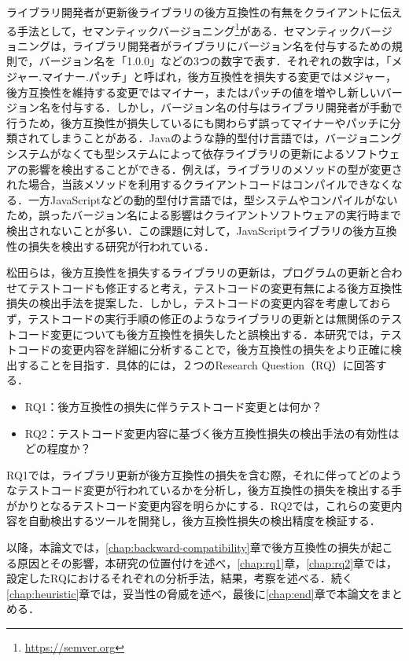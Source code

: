\documentclass[11pt,dvipdfmx]{jreport}
\begin{document}
ライブラリ開発者が更新後ライブラリの後方互換性の有無をクライアントに伝える手法として，セマンティックバージョニング\footnote{\url{https://semver.org}}がある．セマンティックバージョニングは，ライブラリ開発者がライブラリにバージョン名を付与するための規則で，バージョン名を「1.0.0」などの3つの数字で表す．それぞれの数字は，「メジャー.マイナー.パッチ」と呼ばれ，後方互換性を損失する変更ではメジャー，後方互換性を維持する変更ではマイナー，またはパッチの値を増やし新しいバージョン名を付与する．しかし，バージョン名の付与はライブラリ開発者が手動で行うため，後方互換性が損失しているにも関わらず誤ってマイナーやパッチに分類されてしまうことがある．Javaのような静的型付け言語では，バージョニングシステムがなくても型システムによって依存ライブラリの更新によるソフトウェアの影響を検出することができる．例えば，ライブラリのメソッドの型が変更された場合，当該メソッドを利用するクライアントコードはコンパイルできなくなる．一方JavaScriptなどの動的型付け言語では，型システムやコンパイルがないため，誤ったバージョン名による影響はクライアントソフトウェアの実行時まで検出されないことが多い．この課題に対して，JavaScriptライブラリの後方互換性の損失を検出する研究が行われている．

松田らは，後方互換性を損失するライブラリの更新は，プログラムの更新と合わせてテストコードも修正すると考え，テストコードの変更有無による後方互換性損失の検出手法を提案した\cite{matsuda}．しかし，テストコードの変更内容を考慮しておらず，テストコードの実行手順の修正のようなライブラリの更新とは無関係のテストコード変更についても後方互換性を損失したと誤検出する．本研究では，テストコードの変更内容を詳細に分析することで，後方互換性の損失をより正確に検出することを目指す．具体的には，２つのResearch Question（RQ）に回答する．

\begin{itemize}
  \item RQ1：後方互換性の損失に伴うテストコード変更とは何か？
  \item RQ2：テストコード変更内容に基づく後方互換性損失の検出手法の有効性はどの程度か？
\end{itemize}

RQ1では，ライブラリ更新が後方互換性の損失を含む際，それに伴ってどのようなテストコード変更が行われているかを分析し，後方互換性の損失を検出する手がかりとなるテストコード変更内容を明らかにする．RQ2では，これらの変更内容を自動検出するツールを開発し，後方互換性損失の検出精度を検証する．

以降，本論文では，\ref{chap:backward-compatibility}章で後方互換性の損失が起こる原因とその影響，本研究の位置付けを述べ，\ref{chap:rq1}章，\ref{chap:rq2}章では，設定したRQにおけるそれぞれの分析手法，結果，考察を述べる．続く\ref{chap:heuristic}章では，妥当性の脅威を述べ，最後に\ref{chap:end}章で本論文をまとめる．
\end{document}
